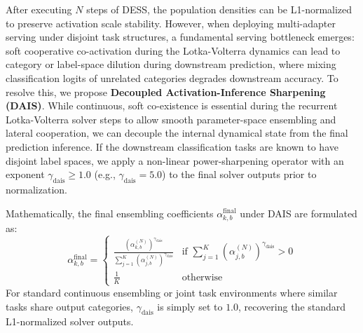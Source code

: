 After executing $N$ steps of DESS, the population densities can be L1-normalized to preserve activation scale stability. However, when deploying multi-adapter serving under disjoint task structures, a fundamental serving bottleneck emerges: soft cooperative co-activation during the Lotka-Volterra dynamics can lead to category or label-space dilution during downstream prediction, where mixing classification logits of unrelated categories degrades downstream accuracy. To resolve this, we propose \textbf{Decoupled Activation-Inference Sharpening (DAIS)}. While continuous, soft co-existence is essential during the recurrent Lotka-Volterra solver steps to allow smooth parameter-space ensembling and lateral cooperation, we can decouple the internal dynamical state from the final prediction inference. If the downstream classification tasks are known to have disjoint label spaces, we apply a non-linear power-sharpening operator with an exponent $\gamma_{\text{dais}} \geq 1.0$ (e.g., $\gamma_{\text{dais}} = 5.0$) to the final solver outputs prior to normalization.

Mathematically, the final ensembling coefficients $\alpha^{\text{final}}_{k, b}$ under DAIS are formulated as:
\begin{equation}
    \alpha^{\text{final}}_{k, b} = \begin{cases}
        \frac{\left(\alpha_{k, b}^{(N)}\right)^{\gamma_{\text{dais}}}}{\sum_{j=1}^K \left(\alpha_{j, b}^{(N)}\right)^{\gamma_{\text{dais}}}} & \text{if } \sum_{j=1}^K \left(\alpha_{j, b}^{(N)}\right)^{\gamma_{\text{dais}}} > 0 \\
        \frac{1}{K} & \text{otherwise}
    \end{cases}
\end{equation}
For standard continuous ensembling or joint task environments where similar tasks share output categories, $\gamma_{\text{dais}}$ is simply set to $1.0$, recovering the standard L1-normalized solver outputs.

